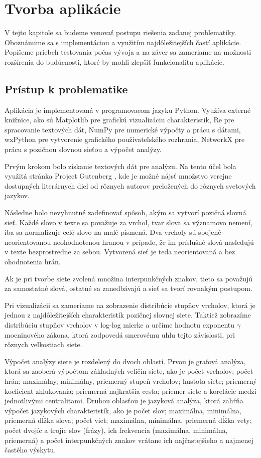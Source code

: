 \chapter{Tvorba aplikácie}\label{ch:appCreation}

V tejto kapitole sa budeme venovať postupu riešenia zadanej problematiky. Oboznámime sa s implementáciou a využitím najdôležitejších
častí aplikácie. Popíšeme priebeh testovania počas vývoja a na záver sa zameriame na možnosti rozšírenia do budúcnosti, ktoré
by mohli zlepšiť funkcionalitu aplikácie.

\section{Prístup k problematike}\label{sec:solutionApproach}

Aplikácia je implementovaná v programovacom jazyku Python. Využíva externé knižnice, ako sú Matplotlib pre grafickú vizualizáciu
charakteristík, Re pre spracovanie textových dát, NumPy pre numerické výpočty a prácu s dátami, wxPython pre vytvorenie grafického
používateľského rozhrania, NetworkX pre prácu s pozičnou slovnou sieťou a výpočet analýzy.

Prvým krokom bolo získanie textových dát pre analýzu. Na tento účel bola využitá stránka Project Gutenberg \cite{projectgutenberg} ,
kde je možné nájsť množstvo verejne dostupných literárnych diel od rôznych autorov preložených do rôznych svetových jazykov.

Následne bolo nevyhnutné zadefinovať spôsob, akým sa vytvorí pozičná slovná sieť. Každé slovo v texte sa považuje za vrchol,
tvar slova sa významovo nemení, iba sa normalizuje celé slovo na malé písmená. Dva vrcholy sú spojené neorientovanou neohodnotenou
hranou v prípade, že im príslušné slová nasledujú v texte bezprostredne za sebou. Vytvorená sieť je teda neorientovaná a bez ohodnotenia hrán.

Ak je pri tvorbe siete zvolená množina interpunkčných znakov, tieto sa považujú za samostatné slová, ostatné sa zanedbávajú a sieť sa tvorí
rovnakým postupom.

Pri vizualizácii sa zameriame na zobrazenie distribúcie stupňov vrcholov, ktorá je jednou z najdôležitejších charakteristík
pozičnej slovnej siete. Taktiež zobrazíme distribúciu stupňov vrcholov v log-log mierke a určíme hodnotu exponentu $\gamma$ mocninového zákona,
ktorá zodpovedá smerovému uhlu tejto závislosti, pri rôznych veľkostiach siete.

Výpočet analýzy siete je rozdelený do dvoch oblastí. Prvou je grafová analýza, ktorá sa zaoberá výpočtom základných veličín siete, ako je
počet vrcholov; počet hrán; maximálny, minimálny, priemerný stupeň vrcholov; hustota siete; priemerný koeficient zhlukovania; priemerná
najkratšia cesta; priemer siete a korelácie medzi jednotlivými centralitami. Druhou oblasťou je jazyková analýza, ktorá zahŕňa výpočet
jazykových charakteristík, ako je počet slov; maximálna, minimálna, priemerná dĺžka slova; počet viet; maximálna, minimálna, priemerná dĺžka vety;
počet dvojíc a trojíc slov (frázy), ich frekvencia (maximálna, minimálna, priemerná) a počet interpunkčných znakov vrátane ich najčastejšieho a najmenej
častého výskytu.

